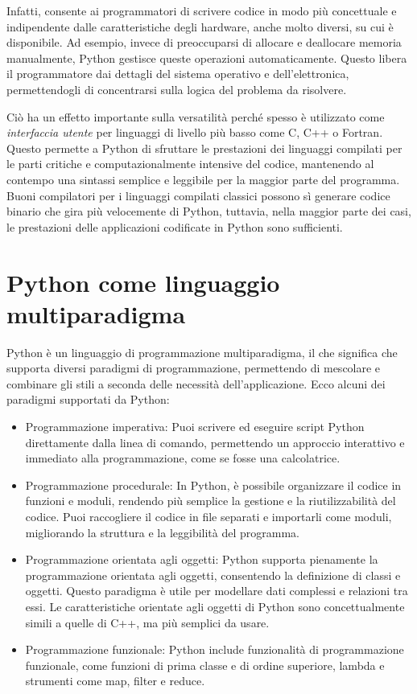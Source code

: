 \documentclass[
  letterpaper,
  DIV=11,
  numbers=noendperiod]{scrreprt}
\providecommand{\tightlist}{%
  \setlength{\itemsep}{0pt}\setlength{\parskip}{0pt}}\usepackage{longtable,booktabs,array}
\begin{document}
Infatti, consente ai programmatori di scrivere codice in modo più
concettuale e indipendente dalle caratteristiche degli hardware, anche
molto diversi, su cui è disponibile. Ad esempio, invece di preoccuparsi
di allocare e deallocare memoria manualmente, Python gestisce queste
operazioni automaticamente. Questo libera il programmatore dai dettagli
del sistema operativo e dell'elettronica, permettendogli di concentrarsi
sulla logica del problema da risolvere.

Ciò ha un effetto importante sulla versatilità perché spesso è
utilizzato come \emph{interfaccia utente} per linguaggi di livello più
basso come C, C++ o Fortran. Questo permette a Python di sfruttare le
prestazioni dei linguaggi compilati per le parti critiche e
computazionalmente intensive del codice, mantenendo al contempo una
sintassi semplice e leggibile per la maggior parte del programma. Buoni
compilatori per i linguaggi compilati classici possono sì generare
codice binario che gira più velocemente di Python, tuttavia, nella
maggior parte dei casi, le prestazioni delle applicazioni codificate in
Python sono sufficienti.

\section{Python come linguaggio
multiparadigma}\label{python-come-linguaggio-multiparadigma}

Python è un linguaggio di programmazione multiparadigma, il che
significa che supporta diversi paradigmi di programmazione, permettendo
di mescolare e combinare gli stili a seconda delle necessità
dell'applicazione. Ecco alcuni dei paradigmi supportati da Python:

\begin{itemize}
\tightlist
\item
  Programmazione imperativa: Puoi scrivere ed eseguire script Python
  direttamente dalla linea di comando, permettendo un approccio
  interattivo e immediato alla programmazione, come se fosse una
  calcolatrice.
\item
  Programmazione procedurale: In Python, è possibile organizzare il
  codice in funzioni e moduli, rendendo più semplice la gestione e la
  riutilizzabilità del codice. Puoi raccogliere il codice in file
  separati e importarli come moduli, migliorando la struttura e la
  leggibilità del programma.
\item
  Programmazione orientata agli oggetti: Python supporta pienamente la
  programmazione orientata agli oggetti, consentendo la definizione di
  classi e oggetti. Questo paradigma è utile per modellare dati
  complessi e relazioni tra essi. Le caratteristiche orientate agli
  oggetti di Python sono concettualmente simili a quelle di C++, ma più
  semplici da usare.
\item
  Programmazione funzionale: Python include funzionalità di
  programmazione funzionale, come funzioni di prima classe e di ordine
  superiore, lambda e strumenti come map, filter e reduce.
\end{itemize}
\end{document}

